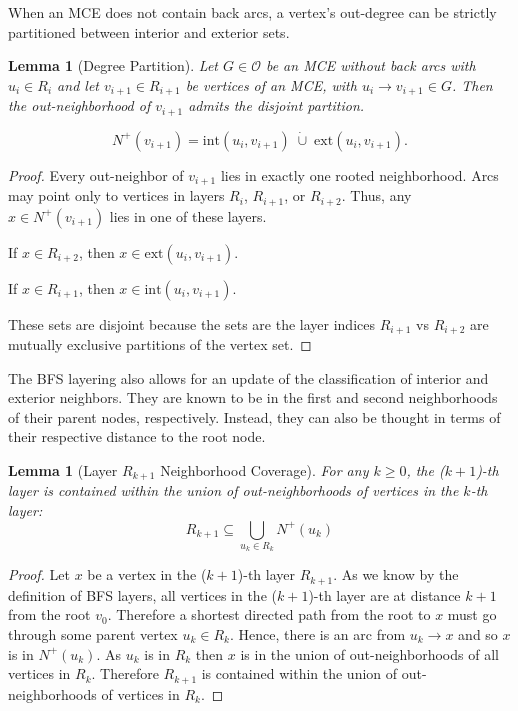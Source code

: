 \documentclass[AMS, Times1COL]{article} %
\newtheorem{lemma}[theorem]{Lemma}
\theoremstyle{definition}
\begin{document}
	When an MCE does not contain back arcs, a vertex's out-degree can be strictly partitioned between interior and exterior sets. 
	
	\label{nodepartition}
	\begin{lemma}[Degree Partition]
		Let $G \in \mathcal{O}$ be an MCE without back arcs with $u_i \in R_i$ and let $v_{i+1} \in R_{i+1}$ be vertices of an MCE, with $u_i \to v_{i+1} \in G$. Then the out-neighborhood of $v_{i+1}$ admits the disjoint partition. 
		
		$$N^+(v_{i+1}) = \text{int}( u_i, v_{i+1}) \;\dot{\cup}\; \text{ext}( u_i, v_{i+1}).$$ 
	\end{lemma}
	\begin{proof}
		Every out-neighbor of $ v_{i+1}$ lies in exactly one rooted neighborhood.
		Arcs may point only to vertices in layers $R_{i}$, $R_{i+1}$, or $R_{i+2}$.
		Thus, any $x \in N^+( v_{i+1})$ lies in one of these layers.
		\begin{description}
			\item If $x \in R_{i+2}$, then $x \in \text{ext}( u_i, v_{i+1})$.
			\item If $x \in R_{i+1}$, then $x \in \text{int}( u_i, v_{i+1})$. 
		\end{description}
		These sets are disjoint because the sets are the layer indices $R_{i+1}$ vs $R_{i+2}$ are mutually exclusive partitions of the vertex set. 
	\end{proof}
			
	The BFS layering also allows for an update of the classification of interior and exterior neighbors. They are known to be in the first and second neighborhoods of their parent nodes, respectively. Instead, they can also be thought in terms of their respective distance to the root node. 	
	
	\begin{lemma}[Layer $R_{k+1}$ Neighborhood Coverage]
		For any $k \ge 0$, the ($k+1$)-th layer is contained within the union of out-neighborhoods of vertices in the $k$-th layer:
		$$R_{k+1} \subseteq \bigcup_{u_k \in R_k} N^+(u_k)$$
	\end{lemma}
	\begin{proof}
		Let $x$ be a vertex in the ($k+1$)-th layer $R_{k+1}$. As we know by the definition of BFS layers, all vertices in the ($k+1$)-th layer are at distance $k+1$ from the root $v_0$. Therefore a shortest directed path from the root to $x$ must go through some parent vertex $u_k \in R_k$. Hence, there is an arc from $u_k \to x$ and so $x$ is in $N^+(u_k)$. As $u_k$ is in $R_k$ then $x$ is in the union of  out-neighborhoods of all vertices in $R_k$. Therefore $R_{k+1}$ is contained within the union of out-neighborhoods of vertices in $R_k$.
	\end{proof}	
	
\end{document}
